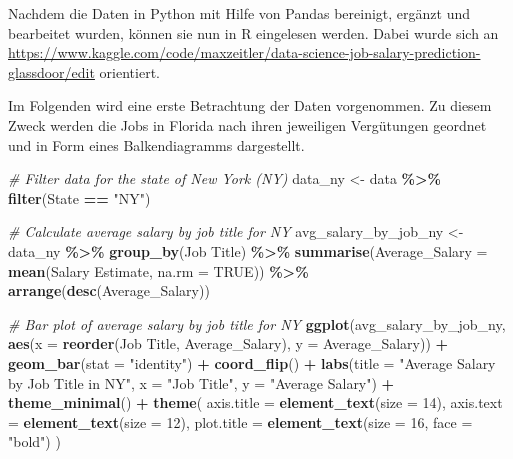 \documentclass[
]{article}
\newenvironment{Shaded}{\begin{snugshade}}{\end{snugshade}}
\newcommand{\AttributeTok}[1]{\textcolor[rgb]{0.13,0.29,0.53}{#1}}
\newcommand{\CommentTok}[1]{\textcolor[rgb]{0.56,0.35,0.01}{\textit{#1}}}
\newcommand{\ConstantTok}[1]{\textcolor[rgb]{0.56,0.35,0.01}{#1}}
\newcommand{\DecValTok}[1]{\textcolor[rgb]{0.00,0.00,0.81}{#1}}
\newcommand{\FunctionTok}[1]{\textcolor[rgb]{0.13,0.29,0.53}{\textbf{#1}}}
\newcommand{\NormalTok}[1]{#1}
\newcommand{\OtherTok}[1]{\textcolor[rgb]{0.56,0.35,0.01}{#1}}
\newcommand{\SpecialCharTok}[1]{\textcolor[rgb]{0.81,0.36,0.00}{\textbf{#1}}}
\newcommand{\StringTok}[1]{\textcolor[rgb]{0.31,0.60,0.02}{#1}}
\begin{document}
Nachdem die Daten in Python mit Hilfe von Pandas bereinigt, ergänzt und
bearbeitet wurden, können sie nun in R eingelesen werden. Dabei wurde
sich an
\url{https://www.kaggle.com/code/maxzeitler/data-science-job-salary-prediction-glassdoor/edit}
orientiert.

Im Folgenden wird eine erste Betrachtung der Daten vorgenommen. Zu
diesem Zweck werden die Jobs in Florida nach ihren jeweiligen
Vergütungen geordnet und in Form eines Balkendiagramms dargestellt.

\begin{Shaded}
\begin{Highlighting}[]
\CommentTok{\# Filter data for the state of New York (NY)}
\NormalTok{data\_ny }\OtherTok{\textless{}{-}}\NormalTok{ data }\SpecialCharTok{\%\textgreater{}\%}
  \FunctionTok{filter}\NormalTok{(State }\SpecialCharTok{==} \StringTok{"NY"}\NormalTok{)}

\CommentTok{\# Calculate average salary by job title for NY}
\NormalTok{avg\_salary\_by\_job\_ny }\OtherTok{\textless{}{-}}\NormalTok{ data\_ny }\SpecialCharTok{\%\textgreater{}\%}
  \FunctionTok{group\_by}\NormalTok{(}\StringTok{\textasciigrave{}}\AttributeTok{Job Title}\StringTok{\textasciigrave{}}\NormalTok{) }\SpecialCharTok{\%\textgreater{}\%}
  \FunctionTok{summarise}\NormalTok{(}\AttributeTok{Average\_Salary =} \FunctionTok{mean}\NormalTok{(}\StringTok{\textasciigrave{}}\AttributeTok{Salary Estimate}\StringTok{\textasciigrave{}}\NormalTok{, }\AttributeTok{na.rm =} \ConstantTok{TRUE}\NormalTok{)) }\SpecialCharTok{\%\textgreater{}\%}
  \FunctionTok{arrange}\NormalTok{(}\FunctionTok{desc}\NormalTok{(Average\_Salary))}

\CommentTok{\# Bar plot of average salary by job title for NY}
\FunctionTok{ggplot}\NormalTok{(avg\_salary\_by\_job\_ny, }\FunctionTok{aes}\NormalTok{(}\AttributeTok{x =} \FunctionTok{reorder}\NormalTok{(}\StringTok{\textasciigrave{}}\AttributeTok{Job Title}\StringTok{\textasciigrave{}}\NormalTok{, Average\_Salary), }\AttributeTok{y =}\NormalTok{ Average\_Salary)) }\SpecialCharTok{+}
  \FunctionTok{geom\_bar}\NormalTok{(}\AttributeTok{stat =} \StringTok{"identity"}\NormalTok{) }\SpecialCharTok{+}
  \FunctionTok{coord\_flip}\NormalTok{() }\SpecialCharTok{+}
  \FunctionTok{labs}\NormalTok{(}\AttributeTok{title =} \StringTok{"Average Salary by Job Title in NY"}\NormalTok{, }\AttributeTok{x =} \StringTok{"Job Title"}\NormalTok{, }\AttributeTok{y =} \StringTok{"Average Salary"}\NormalTok{) }\SpecialCharTok{+}
  \FunctionTok{theme\_minimal}\NormalTok{() }\SpecialCharTok{+}
  \FunctionTok{theme}\NormalTok{(}
    \AttributeTok{axis.title =} \FunctionTok{element\_text}\NormalTok{(}\AttributeTok{size =} \DecValTok{14}\NormalTok{),}
    \AttributeTok{axis.text =} \FunctionTok{element\_text}\NormalTok{(}\AttributeTok{size =} \DecValTok{12}\NormalTok{),}
    \AttributeTok{plot.title =} \FunctionTok{element\_text}\NormalTok{(}\AttributeTok{size =} \DecValTok{16}\NormalTok{, }\AttributeTok{face =} \StringTok{"bold"}\NormalTok{)}
\NormalTok{  )}
\end{Highlighting}
\end{Shaded}
\end{document}
